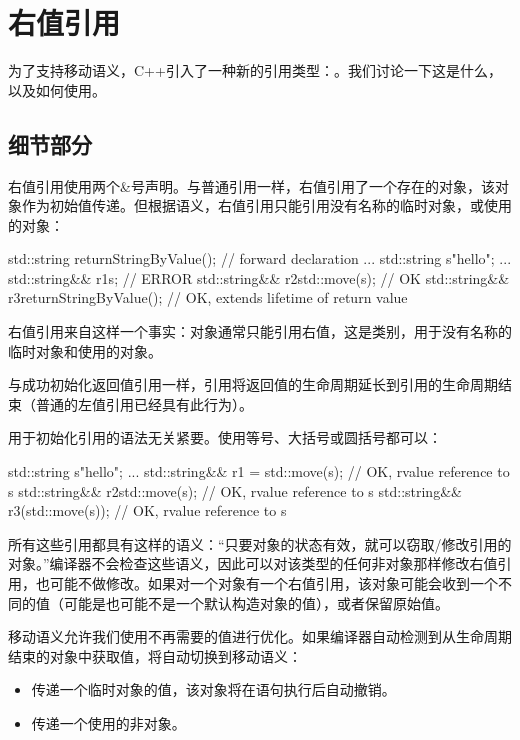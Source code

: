 \section{右值引用}

为了支持移动语义，C++引入了一种新的引用类型：。我们讨论一下这是什么，以及如何使用。

\subsection{细节部分}

右值引用使用两个\&号声明。与普通引用一样，右值引用了一个存在的对象，该对象作为初始值传递。但根据语义，右值引用只能引用没有名称的临时对象，或使用的对象：

\begin{cppcode}
std::string returnStringByValue(); // forward declaration
...
std::string s{"hello"};
...
std::string&& r1{s}; // ERROR
std::string&& r2{std::move(s)}; // OK
std::string&& r3{returnStringByValue()}; // OK, extends lifetime of return value
\end{cppcode}

右值引用来自这样一个事实：对象通常只能引用右值，这是类别，用于没有名称的临时对象和使用的对象。

与成功初始化返回值引用一样，引用将返回值的生命周期延长到引用的生命周期结束（普通的左值引用已经具有此行为）。

用于初始化引用的语法无关紧要。使用等号、大括号或圆括号都可以：

\begin{cppcode}
std::string s{"hello"};
...
std::string&& r1 = std::move(s); // OK, rvalue reference to s
std::string&& r2{std::move(s)}; // OK, rvalue reference to s
std::string&& r3(std::move(s)); // OK, rvalue reference to s
\end{cppcode}

所有这些引用都具有这样的语义：“只要对象的状态有效，就可以窃取/修改引用的对象。”编译器不会检查这些语义，因此可以对该类型的任何非对象那样修改右值引用，也可能不做修改。如果对一个对象有一个右值引用，该对象可能会收到一个不同的值（可能是也可能不是一个默认构造对象的值），或者保留原始值。

移动语义允许我们使用不再需要的值进行优化。如果编译器自动检测到从生命周期结束的对象中获取值，将自动切换到移动语义：

\begin{itemize}
	\item 传递一个临时对象的值，该对象将在语句执行后自动撤销。
	\item 传递一个使用的非对象。
\end{itemize}


